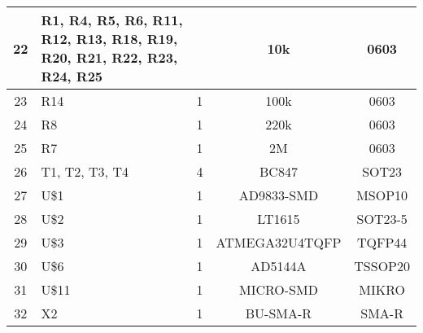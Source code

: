 \begin{center}
\begin{tabular}{|c|p{5cm}|c|c|c|}
22 & R1, R4, R5, R6, R11, R12, R13, R18, R19, R20, R21, R22, R23, R24, R25 & & 10k & 0603 \\ \hline
23 & R14 & 1 & 100k & 0603 \\ \hline
24 & R8 & 1 & 220k & 0603 \\ \hline
25 & R7 & 1 & 2M & 0603 \\ \hline
26 & T1, T2, T3, T4 & 4 & BC847 & SOT23 \\ \hline
27 & U\$1 & 1 & AD9833-SMD & MSOP10  \\ \hline
28 & U\$2 & 1 & LT1615  & SOT23-5  \\ \hline
29 & U\$3 & 1 & ATMEGA32U4TQFP & TQFP44 \\ \hline
30 & U\$6 & 1 & AD5144A & TSSOP20 \\ \hline
31 & U\$11 & 1 & MICRO-SMD & MIKRO \\ \hline
32 & X2 & 1 & BU-SMA-R  & SMA-R \\ \hline

\end{tabular}
\end{center}
